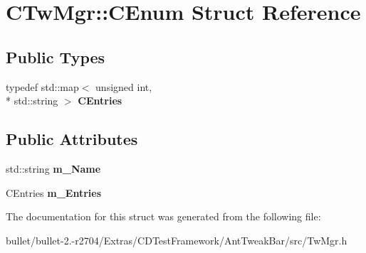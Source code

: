 \hypertarget{struct_c_tw_mgr_1_1_c_enum}{\section{C\+Tw\+Mgr\+:\+:C\+Enum Struct Reference}
\label{struct_c_tw_mgr_1_1_c_enum}
}
\subsection*{Public Types}
\begin{DoxyCompactItemize}
\item 
\hypertarget{struct_c_tw_mgr_1_1_c_enum_a154e21c7b7eb78646668af447e936522}{typedef std\+::map$<$ unsigned int, \\*
std\+::string $>$ {\bfseries C\+Entries}}\label{struct_c_tw_mgr_1_1_c_enum_a154e21c7b7eb78646668af447e936522}

\end{DoxyCompactItemize}
\subsection*{Public Attributes}
\begin{DoxyCompactItemize}
\item 
\hypertarget{struct_c_tw_mgr_1_1_c_enum_a4b3b37affd9ca09eb8d507e8b32d07b0}{std\+::string {\bfseries m\+\_\+\+Name}}\label{struct_c_tw_mgr_1_1_c_enum_a4b3b37affd9ca09eb8d507e8b32d07b0}

\item 
\hypertarget{struct_c_tw_mgr_1_1_c_enum_a8f9d49ae2ce2b5100d841cab19c0a2b4}{C\+Entries {\bfseries m\+\_\+\+Entries}}\label{struct_c_tw_mgr_1_1_c_enum_a8f9d49ae2ce2b5100d841cab19c0a2b4}

\end{DoxyCompactItemize}


The documentation for this struct was generated from the following file\+:\begin{DoxyCompactItemize}
\item 
bullet/bullet-\/2.-\/r2704/\+Extras/\+C\+D\+Test\+Framework/\+Ant\+Tweak\+Bar/src/Tw\+Mgr.\+h\end{DoxyCompactItemize}

